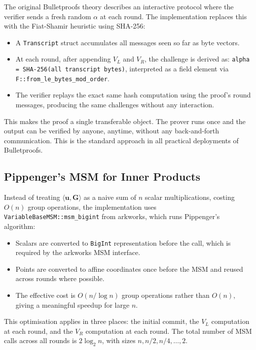 The original Bulletproofs theory describes an interactive protocol where the verifier
sends a fresh random $\alpha$ at each round. The implementation
replaces this with the Fiat-Shamir heuristic using SHA-256:

\begin{itemize}
    \item A \texttt{Transcript} struct accumulates all messages
          seen so far as byte vectors.
    \item At each round, after appending $V_L$ and $V_R$, the
          challenge is derived as:
          \texttt{alpha = SHA-256(all transcript bytes)},
          interpreted as a field element via
          \texttt{F::from\_le\_bytes\_mod\_order}.
    \item The verifier replays the exact same hash computation
          using the proof's round messages, producing the same
          challenges without any interaction.
\end{itemize}

This makes the proof a single transferable object. The prover runs
once and the output can be verified by anyone, anytime, without
any back-and-forth communication. This is the standard approach in
all practical deployments of Bulletproofs.

\subsection{Pippenger's MSM for Inner Products}

Instead of treating $\langle \mathbf{u}, \mathbf{G} \rangle$ as a
naive sum of $n$ scalar multiplications, costing $O(n)$ group
operations, the implementation uses
\texttt{VariableBaseMSM::msm\_bigint} from arkworks, which runs
Pippenger's algorithm:

\begin{itemize}
    \item Scalars are converted to \texttt{BigInt} representation
          before the call, which is required by the arkworks MSM
          interface.
    \item Points are converted to affine coordinates once before
          the MSM and reused across rounds where possible.
    \item The effective cost is $O(n / \log n)$ group operations
          rather than $O(n)$, giving a meaningful speedup for
          large $n$.
\end{itemize}

This optimisation applies in three places: the initial commit,
the $V_L$ computation at each round, and the $V_R$ computation
at each round. The total number of MSM calls across all rounds
is $2 \log_2 n$, with sizes $n, n/2, n/4, \ldots, 2$.

